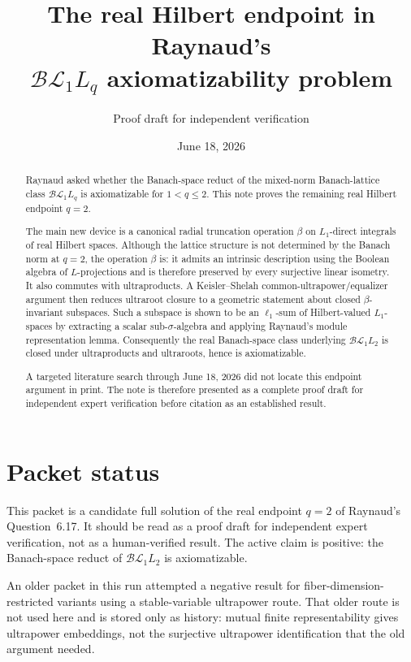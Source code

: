 \documentclass[11pt]{article}
\title{The real Hilbert endpoint in Raynaud's\\
$\mathcal{BL}_1L_q$ axiomatizability problem}
\author{Proof draft for independent verification}
\date{June 18, 2026}
\newcommand{\BL}{\mathcal{BL}}
\newcommand{\1}{\mathbf 1}
\theoremstyle{definition}
\theoremstyle{remark}
\begin{document}
\maketitle

\begin{abstract}
Raynaud asked whether the Banach-space reduct of the mixed-norm Banach-lattice
class $\BL_1L_q$ is axiomatizable for $1<q\leq2$.  This note proves the
remaining real Hilbert endpoint $q=2$.

The main new device is a canonical radial truncation operation $\beta$ on
$L_1$-direct integrals of real Hilbert spaces.  Although the lattice
structure is not determined by the Banach norm at $q=2$, the operation
$\beta$ is: it admits an intrinsic description using the Boolean algebra of
$L$-projections and is therefore preserved by every surjective linear
isometry.  It also commutes with ultraproducts.  A Keisler--Shelah common-ultrapower/equalizer argument then reduces
ultraroot closure to a geometric statement about closed
$\beta$-invariant subspaces.  Such a subspace is shown to be an
$\ell_1$-sum of Hilbert-valued $L_1$-spaces by extracting a scalar
sub-$\sigma$-algebra and applying Raynaud's module representation lemma.
Consequently the real Banach-space class underlying $\BL_1L_2$ is closed
under ultraproducts and ultraroots, hence is axiomatizable.

A targeted literature search through June 18, 2026 did not locate this
endpoint argument in print.  The note is therefore presented as a complete
proof draft for independent expert verification before citation as an
established result.
\end{abstract}

\section*{Packet status}

This packet is a candidate full solution of the real endpoint \(q=2\) of
Raynaud's Question~6.17.  It should be read as a proof draft for independent
expert verification, not as a human-verified result.  The active claim is
positive: the Banach-space reduct of \(\BL_1L_2\) is axiomatizable.

An older packet in this run attempted a negative result for
fiber-dimension-restricted variants using a stable-variable ultrapower route.
That older route is not used here and is stored only as history: mutual finite
representability gives ultrapower embeddings, not the surjective ultrapower
identification that the old argument needed.
\end{document}
